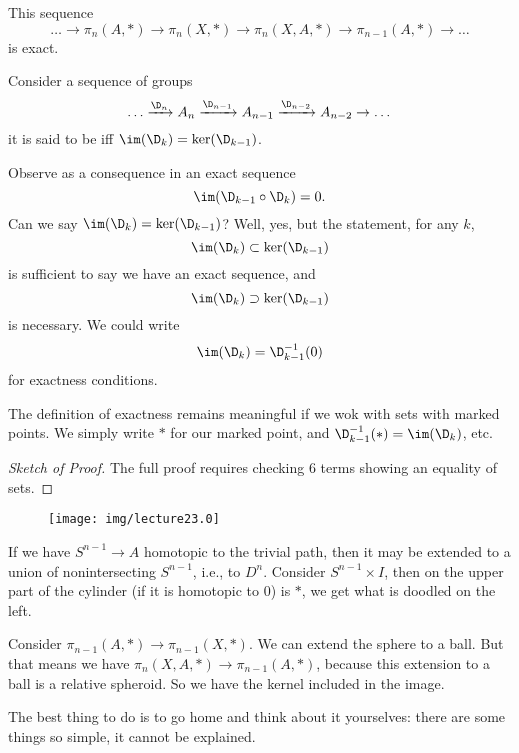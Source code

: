 \begin{thm}
This sequence
\begin{equation}
\dots\to\pi_{n}(A,*)\to\pi_{n}(X,*)\to\pi_{n}(X,A,*)\to\pi_{n-1}(A,*)\to\dots
\end{equation}
is exact.
\end{thm}
\begin{defn}
Consider a sequence of groups
\begin{equation}
\dots\xrightarrow{\D_n}A_{n}\xrightarrow{\D_{n-1}}A_{n-1}\xrightarrow{\D_{n-2}}A_{n-2}\to\dots
\end{equation}
it is said to be 
if{}f $\im(\D_{k})=\ker(\D_{k-1})$.
\end{defn}
Observe as a consequence in an exact sequence
\begin{equation}
\im(\D_{k-1}\circ\D_{k})=0.
\end{equation}
Can we say $\im(\D_{k})=\ker(\D_{k-1})$? Well, yes, but the
statement, for any $k$,
\begin{equation}
\im(\D_{k})\subset\ker(\D_{k-1})
\end{equation}
is sufficient to say we have an exact sequence, and
\begin{equation}
\im(\D_{k})\supset\ker(\D_{k-1})
\end{equation}
is necessary. We could write
\begin{equation}
\im(\D_{k})=\D^{-1}_{k-1}(0)
\end{equation}
for exactness conditions.

\begin{rmk}
The definition of exactness remains meaningful if we wok with
sets with marked points. We simply write $*$ for our marked
point, and $\D^{-1}_{k-1}(*)=\im(\D_{k})$, etc.
\end{rmk}

\begin{proof}[Sketch of Proof]
The full proof requires checking 6 terms showing an equality of
sets.
\end{proof}


\begin{wrapfigure}{l}{0.6in}
  \vspace{-20pt}
  \centering
  \texttt{[image: img/lecture23.0]}
  \vspace{-12pt}
\end{wrapfigure}
If we have $S^{n-1}\to A$ homotopic to the trivial path, then it
may be extended to a union of nonintersecting $S^{n-1}$, i.e., to
$D^{n}$. Consider $S^{n-1}\times I$, then on the upper part of
the cylinder (if it is homotopic to 0) is $*$, we get what is
doodled on the left.

Consider $\pi_{n-1}(A,*)\to\pi_{n-1}(X,*)$. We can extend the
sphere to a ball. But that means we have
$\pi_{n}(X,A,*)\to\pi_{n-1}(A,*)$, because this extension to a
ball is a relative spheroid. So we have the kernel included in
the image.

The best thing to do is to go home and think about it yourselves:
there are some things so simple, it cannot be explained.
